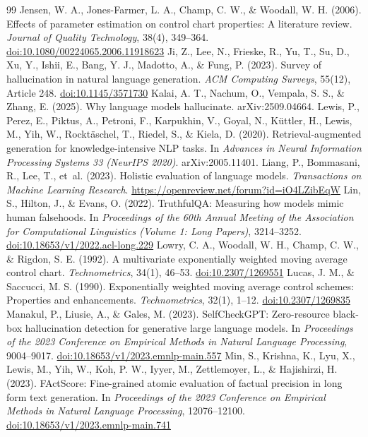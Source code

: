 \documentclass[11pt]{article}
\newcommand{\doi}[1]{\href{https://doi.org/#1}{doi:#1}}
\begin{document}
\begin{thebibliography}{99}
 Jensen, W. A., Jones-Farmer, L. A., Champ, C. W., \& Woodall, W. H. (2006). Effects of parameter estimation on control chart properties: A literature review. \emph{Journal of Quality Technology}, 38(4), 349--364. \doi{10.1080/00224065.2006.11918623}
 Ji, Z., Lee, N., Frieske, R., Yu, T., Su, D., Xu, Y., Ishii, E., Bang, Y. J., Madotto, A., \& Fung, P. (2023). Survey of hallucination in natural language generation. \emph{ACM Computing Surveys}, 55(12), Article 248. \doi{10.1145/3571730}
 Kalai, A. T., Nachum, O., Vempala, S. S., \& Zhang, E. (2025). Why language models hallucinate. arXiv:2509.04664.
 Lewis, P., Perez, E., Piktus, A., Petroni, F., Karpukhin, V., Goyal, N., K\"uttler, H., Lewis, M., Yih, W., Rockt\"aschel, T., Riedel, S., \& Kiela, D. (2020). Retrieval-augmented generation for knowledge-intensive NLP tasks. In \emph{Advances in Neural Information Processing Systems 33 (NeurIPS 2020)}. arXiv:2005.11401.
 Liang, P., Bommasani, R., Lee, T., et~al. (2023). Holistic evaluation of language models. \emph{Transactions on Machine Learning Research}. \url{https://openreview.net/forum?id=iO4LZibEqW}
 Lin, S., Hilton, J., \& Evans, O. (2022). TruthfulQA: Measuring how models mimic human falsehoods. In \emph{Proceedings of the 60th Annual Meeting of the Association for Computational Linguistics (Volume 1: Long Papers)}, 3214--3252. \doi{10.18653/v1/2022.acl-long.229}
 Lowry, C. A., Woodall, W. H., Champ, C. W., \& Rigdon, S. E. (1992). A multivariate exponentially weighted moving average control chart. \emph{Technometrics}, 34(1), 46--53. \doi{10.2307/1269551}
 Lucas, J. M., \& Saccucci, M. S. (1990). Exponentially weighted moving average control schemes: Properties and enhancements. \emph{Technometrics}, 32(1), 1--12. \doi{10.2307/1269835}
 Manakul, P., Liusie, A., \& Gales, M. (2023). SelfCheckGPT: Zero-resource black-box hallucination detection for generative large language models. In \emph{Proceedings of the 2023 Conference on Empirical Methods in Natural Language Processing}, 9004--9017. \doi{10.18653/v1/2023.emnlp-main.557}
 Min, S., Krishna, K., Lyu, X., Lewis, M., Yih, W., Koh, P. W., Iyyer, M., Zettlemoyer, L., \& Hajishirzi, H. (2023). FActScore: Fine-grained atomic evaluation of factual precision in long form text generation. In \emph{Proceedings of the 2023 Conference on Empirical Methods in Natural Language Processing}, 12076--12100. \doi{10.18653/v1/2023.emnlp-main.741}

\end{thebibliography}
\end{document}

